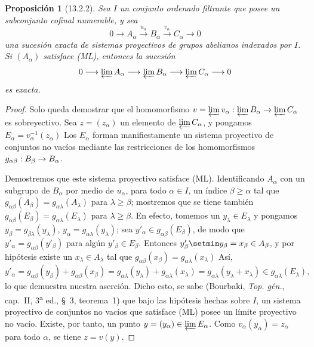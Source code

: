\documentclass[10pt,oneside,openany]{book}
\theoremstyle{egaenv}\newtheorem*{env}{---}
\theoremstyle{egastatement}
\newtheorem*{proposition}{Proposición}
\theoremstyle{egadescription}
\renewcommand{\geq}{\geqslant}
\renewcommand{\to}{\mathchoice{\longrightarrow}{\rightarrow}{\rightarrow}{\rightarrow}}
\begin{document}
\begin{proposition}[13.2.2]
\label{0.13.2.2}
\label{0.13.2.2-fr}
Sea $I$ un conjunto ordenado filtrante que posee un subconjunto
cofinal \textup{numerable}, y sea
\[
0\longrightarrow A_\alpha\xrightarrow{u_\alpha}B_\alpha
\xrightarrow{v_\alpha}C_\alpha\longrightarrow0
\]
una sucesión exacta de sistemas proyectivos de grupos abelianos indexados
por $I$.
Si $(A_\alpha)$ satisface {\rm(ML)}, entonces la sucesión
\[
0\longrightarrow\varprojlim A_\alpha
\longrightarrow\varprojlim B_\alpha
\longrightarrow\varprojlim C_\alpha\longrightarrow0
\]
es exacta.
\end{proposition}

\begin{proof}
Solo queda demostrar que el homomorfismo
$v=\varprojlim v_\alpha:\varprojlim B_\alpha\to\varprojlim C_\alpha$ es sobreyectivo. Sea $z=(z_\alpha)$ un elemento de $\varprojlim C_\alpha$, y pongamos
$E_\alpha=v_\alpha^{-1}(z_\alpha)$
Los $E_\alpha$ forman manifiestamente un sistema proyectivo de conjuntos no
vacíos mediante las restricciones de los homomorfismos
$g_{\alpha\beta}:B_\beta\to B_\alpha$.

Demostremos que este sistema proyectivo satisface (ML).
Identificando $A_\alpha$ con un subgrupo de $B_\alpha$ por medio de
$u_\alpha$, para todo $\alpha\in I$, un índice
$\beta\geq\alpha$ tal que $g_{\alpha\beta}(A_\beta)=g_{\alpha\lambda}(A_\lambda)$ para $\lambda\geq\beta$; mostremos que se tiene también $g_{\alpha\beta}(E_\beta)=g_{\alpha\lambda}(E_\lambda)$ para $\lambda\geq\beta$. En efecto, tomemos un $y_\lambda\in E_\lambda$ y pongamos $y_\beta=g_{\beta\lambda}(y_\lambda)$, $y_\alpha=g_{\alpha\lambda}(y_\lambda)$; sea $y'_\alpha\in g_{\alpha\beta}(E_\beta)$, de modo que
$y'_\alpha=g_{\alpha\beta}(y'_\beta)$ para algún
$y'_\beta\in E_\beta$.
Entonces $y'_\beta\setmin y_\beta=x_\beta\in A_\beta$, y por hipótesis existe
un $x_\lambda\in A_\lambda$ tal que
$g_{\alpha\beta}(x_\beta)=g_{\alpha\lambda}(x_\lambda)$
Así,
\[
y'_\alpha=g_{\alpha\beta}(y_\beta)+g_{\alpha\beta}(x_\beta)
=g_{\alpha\lambda}(y_\lambda)+g_{\alpha\lambda}(x_\lambda)
=g_{\alpha\lambda}(y_\lambda+x_\lambda)
\in g_{\alpha\lambda}(E_\lambda),
\] lo que demuestra nuestra aserción. Dicho esto, se sabe (Bourbaki, \emph{Top. gén.}, cap.~II, 3\textsuperscript{a} ed., §~3, teorema~1) que bajo las hipótesis hechas sobre $I$, un sistema proyectivo de conjuntos no vacíos que satisface (ML)
posee un límite proyectivo no vacío.
Existe, por tanto, un punto
$y=(y_\alpha)\in\varprojlim E_\alpha$.
Como $v_\alpha(y_\alpha)=z_\alpha$ para todo $\alpha$, se tiene
$z=v(y)$.
\end{proof}
\end{document}
